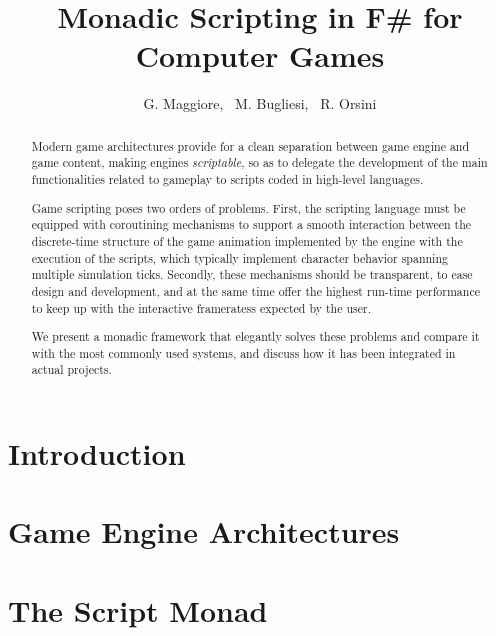 \documentclass{llncs}
\begin{document}
\title{Monadic Scripting in F\# for Computer Games}

\author{
G. Maggiore, \ M. Bugliesi, \ R. Orsini
}

\maketitle

\date{}

\begin{abstract}
Modern game architectures provide for a clean separation between
game engine and game content, making engines \textit{scriptable}, so
as to delegate the development of the main functionalities related to
gameplay to scripts coded in high-level languages. 

Game scripting poses two orders of problems. First, the scripting
language must be equipped with coroutining mechanisms to support a
smooth interaction between the discrete-time structure of the game
animation implemented by the engine with the execution of the
scripts, which typically implement character behavior spanning 
multiple simulation ticks. Secondly, these mechanisms should be transparent, to
ease design and development, and at the same time offer the highest
run-time performance to keep up with the interactive frameratess
expected by the user. 

We present a monadic framework that elegantly solves these problems
and compare it with the most commonly used systems, and discuss how it has
been integrated in actual projects. 
\end{abstract}


\section{Introduction}
\label{sec:intro}
 

\section{Game Engine Architectures}
\label{sec:scripting_in_games}
 

\section{The Script Monad}
\label{sec:script_monad}
 
\end{document}

